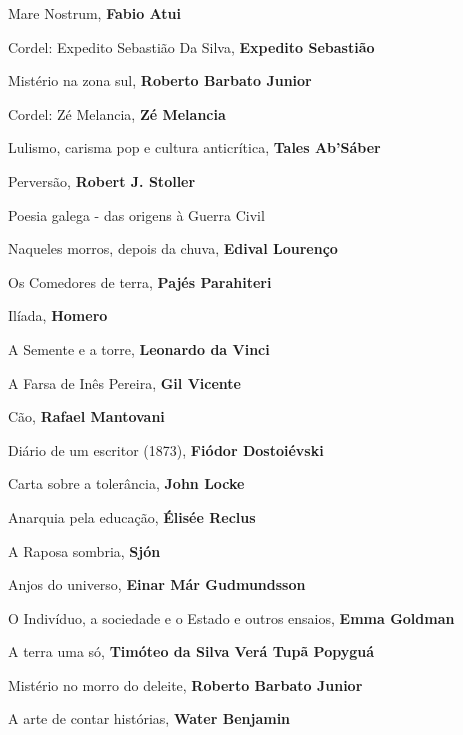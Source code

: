 \begin{multicols}{2}
\begin{enumerate}
{\item Mare Nostrum, \textbf{Fabio Atui}
\item Cordel: Expedito Sebastião Da Silva, \textbf{Expedito Sebastião}
\item Mistério na zona sul, \textbf{Roberto Barbato Junior}
\item Cordel: Zé Melancia, \textbf{Zé Melancia}
\item Lulismo, carisma pop e cultura anticrítica, \textbf{Tales Ab'Sáber}
\item Perversão, \textbf{Robert J. Stoller}
\item Poesia galega - das origens à Guerra Civil
\item Naqueles morros, depois da chuva, \textbf{Edival Lourenço}
\item Os Comedores de terra, \textbf{Pajés Parahiteri}
\item Ilíada, \textbf{Homero}
\item A Semente e a torre, \textbf{Leonardo da Vinci}
\item A Farsa de Inês Pereira, \textbf{Gil Vicente}
\item Cão, \textbf{Rafael Mantovani}
\item Diário de um escritor (1873), \textbf{Fiódor Dostoiévski}
\item Carta sobre a tolerância, \textbf{John Locke}
\item Anarquia pela educação, \textbf{Élisée Reclus}
\item A Raposa sombria, \textbf{Sjón}
\item Anjos do universo, \textbf{Einar Már Gudmundsson}
\item O Indivíduo, a sociedade e o Estado e outros ensaios, \textbf{Emma Goldman}
\item A terra uma só, \textbf{Timóteo da Silva Verá Tupã Popyguá}
\item Mistério no morro do deleite, \textbf{Roberto Barbato Junior}
\item A arte de contar histórias, \textbf{Water Benjamin}
}
\end{enumerate}
\end{multicols}

\pagebreak
